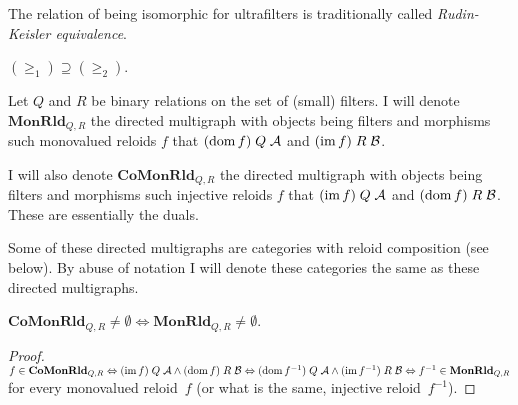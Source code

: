 \begin{rem}
The relation of being isomorphic
for ultrafilters is traditionally called \emph{Rudin-Keisler equivalence}.\end{rem}
\begin{obvious}
$(\ge_{1})\supseteq(\ge_{2})$.\end{obvious}
\begin{defn}
Let $Q$ and $R$ be binary relations on the set of (small) filters. I will
denote $\mathbf{MonRld}_{Q,R}$ the directed multigraph with objects
being filters and morphisms such monovalued reloids $f$ that $(\operatorname{dom} f)\mathrel Q\mathcal{A}$
and $(\operatorname{im} f)\mathrel R\mathcal{B}$.

I will also denote $\mathbf{CoMonRld}_{Q,R}$ the directed multigraph
with objects being filters and morphisms such injective reloids $f$
that $(\operatorname{im} f)\mathrel Q\mathcal{A}$ and $(\operatorname{dom} f)\mathrel R\mathcal{B}$.
These are essentially the duals.
\end{defn}
Some of these directed multigraphs are categories with reloid composition
(see below). By abuse of notation I will denote these categories the
same as these directed multigraphs.

\begin{lem}
$\mathbf{CoMonRld}_{Q,R}\ne\emptyset \Leftrightarrow\mathbf{MonRld}_{Q,R}\ne\emptyset$.
\end{lem}
\begin{proof}
$f\in\mathbf{CoMonRld}_{Q,R} \Leftrightarrow
(\operatorname{im} f)\mathrel Q\mathcal{A} \land (\operatorname{dom} f)\mathrel R\mathcal{B} \Leftrightarrow
(\operatorname{dom} f^{-1})\mathrel Q\mathcal{A} \land (\operatorname{im} f^{-1})\mathrel R\mathcal{B} \Leftrightarrow
f^{-1}\in\mathbf{MonRld}_{Q,R}$ for every monovalued reloid~$f$ (or what is the same, injective reloid~$f^{-1}$).
\end{proof}

